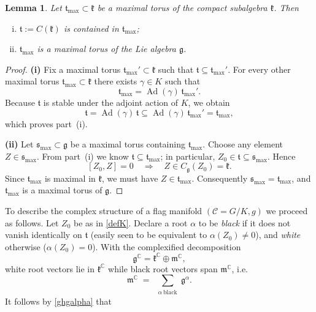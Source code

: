 \documentclass[reqno]{amsart}
\newcommand{\C}{\mathds{C}}
\newtheorem{lem}[theor]{Lemma}
\begin{document}
\begin{lem}\label{lemmaxtori}
Let \(\mathfrak t_{\max}\subset \mathfrak k\) be a maximal torus of the compact subalgebra \(\mathfrak k\). Then
\begin{enumerate}[(i)]
  \item  \(\mathfrak t:=C(\mathfrak k)\) is contained in \(\mathfrak t_{\max}\);
  \item \(\mathfrak t_{\max}\) is a maximal torus of the Lie algebra \(\mathfrak g\).
\end{enumerate}
\end{lem}

\begin{proof}
\textbf{(i)}\; Fix a maximal torus \(\mathfrak t_{\max}'\subset\mathfrak k\)
such that  $\mathfrak t\subseteq \mathfrak t_{\max}'$. For every other maximal torus \(\mathfrak t_{\max}\subset\mathfrak k\) there exists \(\gamma\in K\) such that 
\[
  \mathfrak t_{\max}=\operatorname{Ad}(\gamma)\,\mathfrak t_{\max}'.
\]
Because \(\mathfrak t\) is stable under the adjoint action of \(K\), we obtain
\[
  \mathfrak t=\operatorname{Ad}(\gamma)\,\mathfrak t\subseteq\operatorname{Ad}(\gamma)\,\mathfrak t_{\max}'=\mathfrak t_{\max},
\]
which proves part~(i).

\medskip
\noindent
\textbf{(ii)}\; Let \(\mathfrak s_{\max}\subset\mathfrak g\) be a maximal torus containing \(\mathfrak t_{\max}\). Choose any element \(Z\in\mathfrak s_{\max}\). From part~(i) we know \(\mathfrak t\subseteq\mathfrak t_{\max}\); in particular, \(Z_0\in\mathfrak t\subseteq\mathfrak s_{\max}\). Hence
\[
  [Z_0,Z]=0 \quad\Longrightarrow\quad Z\in C_{\mathfrak g}(Z_0)=\mathfrak k.
\]
Since \(\mathfrak t_{\max}\) is maximal in \(\mathfrak k\), we must have \(Z\in\mathfrak t_{\max}\). Consequently \(\mathfrak s_{\max}=\mathfrak t_{\max}\), and \(\mathfrak t_{\max}\) is a maximal torus of \(\mathfrak g\).
\end{proof}



To describe the complex structure of a flag manifold $(\mathcal C=G/K, g)$ we proceed as follows.
Let $Z_0$ be as in \eqref{defK}.
Declare a root \(\alpha\) to be \emph{black} if it does not vanish identically on \(\mathfrak{t}\) (easily seen to be equivalent to \(\alpha(Z_0)\neq0\)), and \emph{white} otherwise (\(\alpha(Z_0)=0\)).
With the complexified decomposition
\begin{equation}\label{gC}
   \mathfrak{g}^{\C}= \mathfrak{k}^{\C}\oplus\mathfrak{m}^{\C},
\end{equation}
white root vectors lie in \(\mathfrak{k}^{\C}\) while black root vectors span $ \mathfrak{m}^{\C}$, i.e.
\begin{equation}\label{mcblack}
   \mathfrak{m}^{\C} \;=\; 
\sum_{\substack{\alpha \ \text{black}}} \mathfrak{g}^{\alpha}.
\end{equation}
It follows by \eqref{ghgalpha} that
\end{document}
